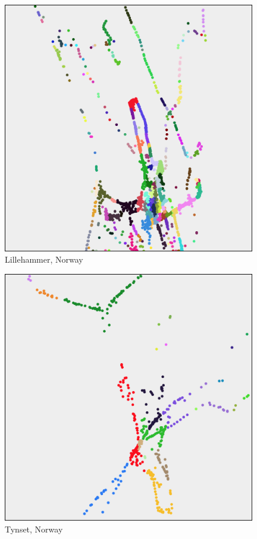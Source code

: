 \begin{appendices}
	\begin{figure}
		\centering
		\includegraphics[width=11cm]{Images/computations/BASICLillehammer.jpg}
		\caption{Lillehammer, Norway}
	\end{figure}

	\begin{figure}[H]
		\centering
		\includegraphics[width=11cm]{Images/computations/BASICTynset.jpg}
		\caption{Tynset, Norway}
	\end{figure}
	







\end{appendices}
